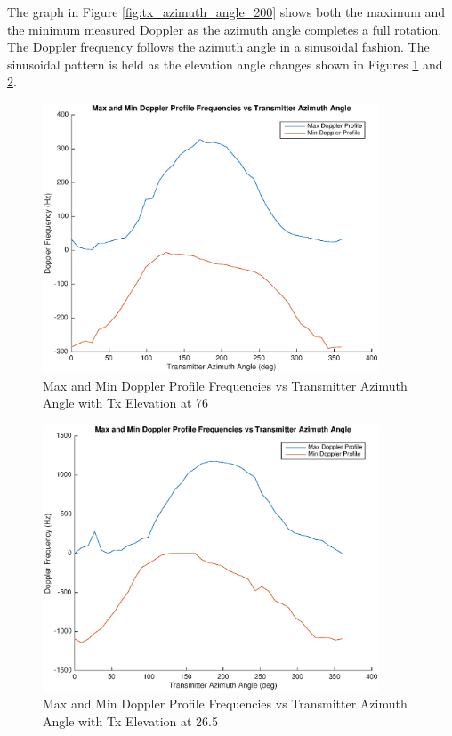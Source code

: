 The graph in Figure \ref{fig:tx_azimuth_angle_200} shows both the maximum and the minimum measured Doppler as the azimuth angle completes a full rotation. The Doppler frequency follows the azimuth angle in a sinusoidal fashion. The sinusoidal pattern is held as the elevation angle changes shown in Figures \ref{fig:tx_azimuth_angle_50} and \ref{fig:tx_azimuth_angle_400}.

\begin{figure}
	\begin{center}
		\includegraphics[width=10cm]{images/simulation/Azimuth_angle_50_max_doppler.eps}
		\caption{Max and Min Doppler Profile Frequencies vs Transmitter Azimuth Angle with Tx Elevation at 76\textdegree}
		\label{fig:tx_azimuth_angle_50}
	\end{center}
\end{figure}

\begin{figure}
	\begin{center}
		\includegraphics[width=10cm]{images/simulation/Azimuth_angle_400_max_doppler.eps}
		\caption{Max and Min Doppler Profile Frequencies vs Transmitter Azimuth Angle with Tx Elevation at 26.5\textdegree}
		\label{fig:tx_azimuth_angle_400}
	\end{center}
\end{figure}

